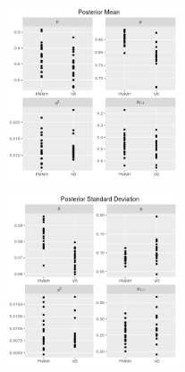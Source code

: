 \documentclass[12pt,a4paper]{article}%
\numberwithin{equation}{section}
\begin{document}
\begin{figure}[h]
\centering
\includegraphics[width=0.45\textwidth]{mean}
\end{figure}

\begin{figure}[h]
\centering
\includegraphics[width=0.45\textwidth]{standardDev}
\end{figure}
\end{document}
